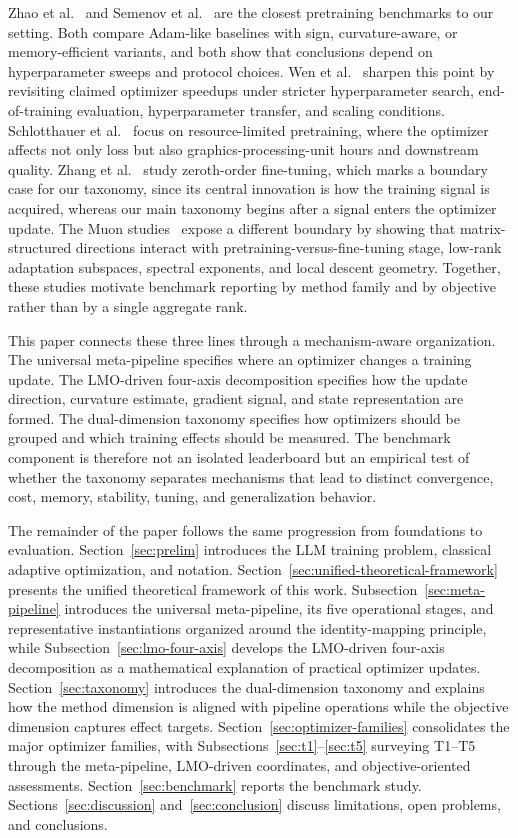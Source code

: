 Zhao et al.~\citep{zhao2025deconstructing} and Semenov et
al.~\citep{semenov2025benchmarking} are the closest pretraining benchmarks to
our setting.  Both compare Adam-like baselines with sign, curvature-aware, or
memory-efficient variants, and both show that conclusions depend on
hyperparameter sweeps and protocol choices.  Wen et
al.~\citep{wen2025fantastic} sharpen this point by revisiting claimed optimizer
speedups under stricter hyperparameter search, end-of-training evaluation,
hyperparameter transfer, and scaling conditions.  Schlotthauer et
al.~\citep{schlotthauer2025budget} focus on resource-limited pretraining, where
the optimizer affects not only loss but also graphics-processing-unit hours and
downstream quality.  Zhang et al.~\citep{zhang2024zerothorder} study
zeroth-order fine-tuning, which marks a boundary case for our taxonomy, since
its central innovation is how the training signal is acquired, whereas our main
taxonomy begins after a signal enters the optimizer update.  The Muon
studies~\citep{qu2026muonfinetune,shumaylov2026muonnot} expose a different
boundary by showing that matrix-structured directions interact with
pretraining-versus-fine-tuning stage, low-rank adaptation subspaces, spectral
exponents, and local descent geometry.  Together, these studies motivate
benchmark reporting by method family and by objective rather than by a single
aggregate rank.

This paper connects these three lines through a mechanism-aware organization.
The universal meta-pipeline specifies where an optimizer changes a training
update.  The LMO-driven four-axis decomposition specifies how the update
direction, curvature estimate, gradient signal, and state representation are
formed.  The dual-dimension taxonomy specifies how optimizers should be grouped
and which training effects should be measured.  The benchmark component is
therefore not an isolated leaderboard but an empirical test of whether the
taxonomy separates mechanisms that lead to distinct convergence, cost, memory,
stability, tuning, and generalization behavior.

The remainder of the paper follows the same progression from foundations to
evaluation.  Section~\ref{sec:prelim} introduces the LLM training problem,
classical adaptive optimization, and notation.
Section~\ref{sec:unified-theoretical-framework} presents the unified
theoretical framework of this work.  Subsection~\ref{sec:meta-pipeline} introduces the
universal meta-pipeline, its five operational stages, and representative
instantiations organized around the identity-mapping principle, while
Subsection~\ref{sec:lmo-four-axis} develops the LMO-driven four-axis
decomposition as a mathematical explanation of practical optimizer updates.
Section~\ref{sec:taxonomy} introduces the dual-dimension taxonomy and explains
how the method dimension is aligned with pipeline operations while the
objective dimension captures effect targets.
Section~\ref{sec:optimizer-families} consolidates the major optimizer families,
with Subsections~\ref{sec:t1}--\ref{sec:t5} surveying T1--T5 through the
meta-pipeline, LMO-driven coordinates, and objective-oriented assessments.
Section~\ref{sec:benchmark} reports the benchmark study.  Sections~\ref{sec:discussion} and~\ref{sec:conclusion}
discuss limitations, open problems, and conclusions.